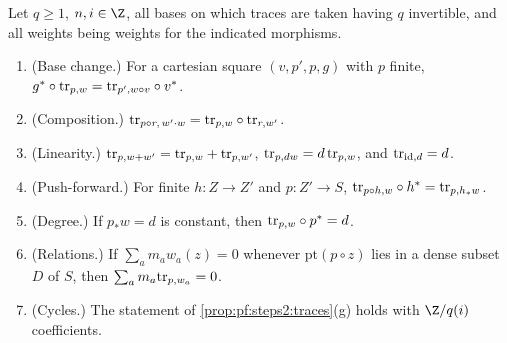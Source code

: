 \begin{proposition}\label{prop:pf:steps2:trtors}
Let $q\ge1$, $n,i\in\Z$, all bases on which traces are taken having $q$ invertible, and all weights
being weights for the indicated morphisms.
\begin{enumerate}[label=\textup{(\alph*)},nosep]
\item \textup{(Base change.)} For a cartesian square $(v,p',p,g)$ with $p$ finite,
  $g^\ast\circ\mathrm{tr}_{p,w}=\mathrm{tr}_{p',w\circ v}\circ v^\ast$.
\item \textup{(Composition.)} $\mathrm{tr}_{p\circ r,\,w'\cdot w}=\mathrm{tr}_{p,w}\circ\mathrm{tr}_{r,w'}$.
\item \textup{(Linearity.)} $\mathrm{tr}_{p,w+w'}=\mathrm{tr}_{p,w}+\mathrm{tr}_{p,w'}$,
  $\mathrm{tr}_{p,dw}=d\,\mathrm{tr}_{p,w}$, and $\mathrm{tr}_{\mathrm{id},d}=d$.
\item \textup{(Push-forward.)} For finite $h\colon Z\to Z'$ and $p\colon Z'\to S$,
  $\mathrm{tr}_{p\circ h,w}\circ h^\ast=\mathrm{tr}_{p,h_\ast w}$.
\item \textup{(Degree.)} If $p_\ast w=d$ is constant, then $\mathrm{tr}_{p,w}\circ p^\ast=d$.
\item \textup{(Relations.)} If $\sum_am_aw_a(z)=0$ whenever $\mathrm{pt}(p\circ z)$ lies in a dense
  subset $D$ of $S$, then $\sum_am_a\mathrm{tr}_{p,w_a}=0$.
\item \textup{(Cycles.)} The statement of \cref{prop:pf:steps2:traces}(g) holds with $\Z/q(i)$
  coefficients.
\end{enumerate}
\end{proposition}


